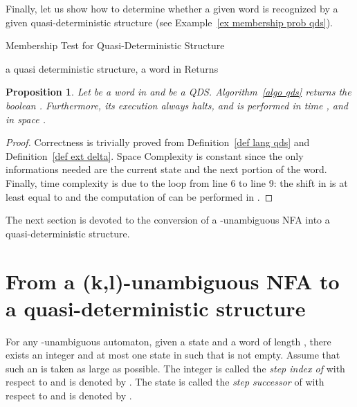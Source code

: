 \documentclass[11pt]{elsarticle}
\newtheorem{proposition}{Proposition}
\newcommand\modif[2]{{#2}}
\begin{document}
Finally, let us show how to determine whether a given word is recognized by a given quasi-deterministic structure (see Example~\ref{ex membership prob qds}).

\begin{algorithm}[H]
  \caption{Membership Test for Quasi-Deterministic Structure}
  \label{algo qds}
  \begin{algorithmic}[1]
    \REQUIRE  a quasi deterministic structure,  a word in  
    \ENSURE Returns  
\IF{}
      \RETURN 
    \ENDIF
    \STATE   
    \STATE   
    \WHILE{}
      \STATE   
      \STATE   
    \ENDWHILE    
    \RETURN  
  \end{algorithmic}
\end{algorithm}

\begin{proposition}\label{prop algo mb ok}
  \modif{}{Let  be a word in  and  be a QDS.}
  Algorithm~\ref{algo qds} returns \modif{TRUE if and only if}{the boolean} . Furthermore, its execution always halts, and is performed in time ,  and in space .\end{proposition}
\begin{proof}
  Correctness is trivially proved from Definition~\ref{def lang qds} and Definition~\ref{def ext delta}. Space Complexity is constant since the only informations needed are the current state and the next portion of the word. Finally, time complexity is due to the loop from line 6 to line 9: the shift in  is at least equal to  and the computation of  can be performed in .\modif{ Hence the announced complexity.}{}  
  
\end{proof}

\modif{N}{The n}ext section is devoted to the conversion of a -unambiguous NFA into a quasi-deterministic structure.

\section{From a (k,l)-unambiguous NFA to a quasi-deterministic structure}\label{se:klnanfa2qds}

For any -unambiguous automaton, given a state  and a word  of length , there exists an integer  \modif{such that there exists}{and} at most one state  in  such that  is not empty. \modif{}{Assume that such an  is taken as large as possible.} The integer  is called the \emph{step index of}  with respect to  and is denoted by  \emph{}. The state  is called the \emph{step successor} of  with respect to  and is denoted by \emph{}.
\end{document}
